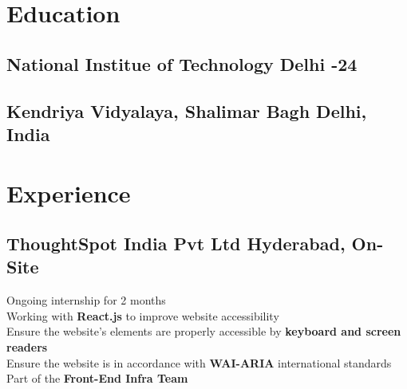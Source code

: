 \documentclass[]{Nikhil_Kadiyan_Resume}
\begin{document}

\descript{}

\section{Education}
\hrulefill

\subsection{National Institue of Technology Delhi \hfill {}-24}

\sectionsep

\subsection{Kendriya Vidyalaya, Shalimar Bagh \hfill \normalfont Delhi, India}

\sectionsep

\section{Experience} 
\hrulefill

\subsection{ThoughtSpot India Pvt Ltd \hfill \normalfont Hyderabad, On-Site}
\pt Ongoing internship for 2 months\\
\pt Working with \textbf{React.js} to improve website accessibility\\
\pt Ensure the website's elements are properly accessible  by \textbf{keyboard and screen readers}\\
\pt Ensure the website is in accordance with \textbf{WAI-ARIA} international standards\\
\pt Part of the \textbf{Front-End Infra Team}\\
\sectionsep
\end{document}
